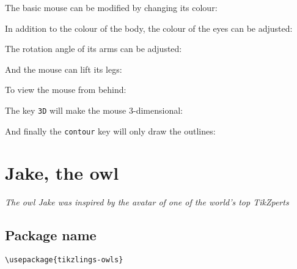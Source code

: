 \documentclass[parskip=half]{scrartcl}
\begin{document}
The basic mouse can be modified by changing its colour:
\begin{tcblisting}{}
\mouse[body=blue]
\end{tcblisting}

In addition to the colour of the body, the colour of the eyes can be adjusted:
\begin{tcblisting}{}
\mouse[eye=red]
\end{tcblisting}

The rotation angle of its arms can be adjusted:
\begin{tcblisting}{}
\mouse[rotatearms=40]
\end{tcblisting}

And the mouse can lift its legs:
\begin{tcblisting}{}
\mouse[leftstep]
\mouse[rightstep,xshift=2cm]
\end{tcblisting}

To view the mouse from behind:
\begin{tcblisting}{}
\mouse[back]
\end{tcblisting}

The key \lstinline|3D| will make the mouse 3-dimensional:
\begin{tcblisting}{}
\mouse[3D]
\end{tcblisting}

And finally the \lstinline|contour| key will only draw the outlines:
\begin{tcblisting}{}
\mouse[contour=black]
\end{tcblisting}

%
%
\clearpage
\section[Owl]{Jake, the owl}

\emph{The owl Jake was inspired by the avatar of one of the world's top TikZperts}

\subsection{Package name}

\begin{tcolorbox}[lower separated=false, lefthand width=.8\linewidth]
\vspace*{0.5cm}
\lstinline|\usepackage{tikzlings-owls}| 
\vspace*{0.5cm}
\end{tcolorbox}
\end{document}
